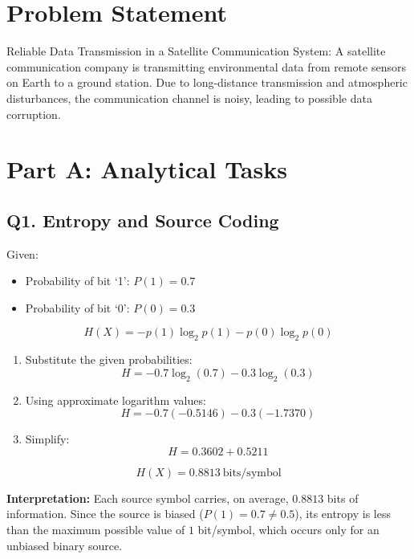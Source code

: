 \documentclass[12pt,a4paper]{article}
\begin{document}
\small

\section*{Problem Statement}
Reliable Data Transmission in a Satellite Communication System: A satellite 
communication company is transmitting environmental data from remote sensors on Earth to 
a ground station. Due to long-distance transmission and atmospheric disturbances, the 
communication channel is noisy, leading to possible data corruption.

\section*{Part A: Analytical Tasks}

\subsection*{Q1. Entropy and Source Coding}
Given:
\begin{itemize}[leftmargin=2em]
    \item Probability of bit `1': $P(1)=0.7$
    \item Probability of bit `0': $P(0)=0.3$
\end{itemize}

\begin{formulaBox}
\[
H(X) = -p(1)\log_2 p(1) - p(0)\log_2 p(0)
\]
\end{formulaBox}

\begin{enumerate}[leftmargin=2em,label=\arabic*.]
    \item Substitute the given probabilities:
    \[
    H = -0.7\log_2(0.7) - 0.3\log_2(0.3)
    \]

    \item Using approximate logarithm values:
    \[
    H = -0.7(-0.5146) - 0.3(-1.7370)
    \]

    \item Simplify:
    \[
    H = 0.3602 + 0.5211
    \]
\end{enumerate}

\[
\boxed{H(X)=0.8813\ \text{bits/symbol}}
\]

\begin{blueNote}
\textbf{Interpretation:} Each source symbol carries, on average, $0.8813$ bits of information. Since the source is biased ($P(1)=0.7 \neq 0.5$), its entropy is less than the maximum possible value of $1$ bit/symbol, which occurs only for an unbiased binary source.
\end{blueNote}
\end{document}
